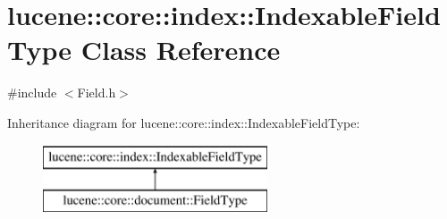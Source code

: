 \hypertarget{classlucene_1_1core_1_1index_1_1IndexableFieldType}{}\section{lucene\+:\+:core\+:\+:index\+:\+:Indexable\+Field\+Type Class Reference}
\label{classlucene_1_1core_1_1index_1_1IndexableFieldType}


{\ttfamily \#include $<$Field.\+h$>$}

Inheritance diagram for lucene\+:\+:core\+:\+:index\+:\+:Indexable\+Field\+Type\+:\begin{figure}[H]
\begin{center}
\leavevmode
\includegraphics[height=2.000000cm]{classlucene_1_1core_1_1index_1_1IndexableFieldType}
\end{center}
\end{figure}
